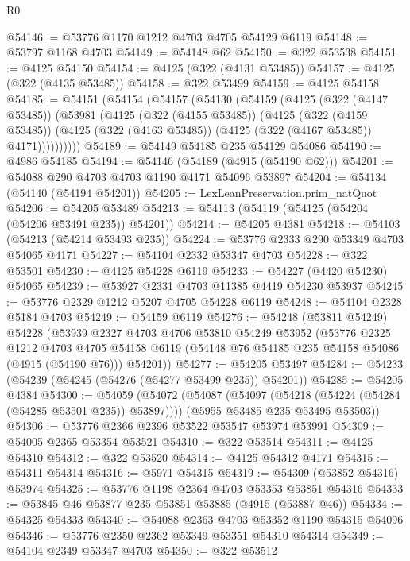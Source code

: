 \begin{lexlean}{R0}
\begin{coremodule}
@54146 := @53776 @1170 @1212 @4703 @4705 @54129 @6119
@54148 := @53797 @1168 @4703
@54149 := @54148 @62
@54150 := @322 @53538
@54151 := @4125 @54150
@54154 := @4125 (@322 (@4131 @53485))
@54157 := @4125 (@322 (@4135 @53485))
@54158 := @322 @53499
@54159 := @4125 @54158
@54185 := @54151
    (@54154
      (@54157
        (@54130
          (@54159
            (@4125
              (@322 (@4147 @53485))
              (@53981
                (@4125
                  (@322 (@4155 @53485))
                  (@4125
                    (@322 (@4159 @53485))
                    (@4125 (@322 (@4163 @53485)) (@4125 (@322 (@4167 @53485)) @4171))))))))))
@54189 := @54149 @54185 @235 @54129 @54086
@54190 := @4986 @54185
@54194 := @54146 (@54189 (@4915 (@54190 @62)))
@54201 := @54088 @290 @4703 @4703 @1190 @4171 @54096 @53897
@54204 := @54134 (@54140 (@54194 @54201))
@54205 := LexLeanPreservation.prim_natQuot
@54206 := @54205 @53489
@54213 := @54113 (@54119 (@54125 (@54204 (@54206 @53491 @235)) @54201))
@54214 := @54205 @4381
@54218 := @54103 (@54213 (@54214 @53493 @235))
@54224 := @53776 @2333 @290 @53349 @4703 @54065 @4171
@54227 := @54104 @2332 @53347 @4703
@54228 := @322 @53501
@54230 := @4125 @54228 @6119
@54233 := @54227 (@4420 @54230) @54065
@54239 := @53927 @2331 @4703 @11385 @4419 @54230 @53937
@54245 := @53776 @2329 @1212 @5207 @4705 @54228 @6119
@54248 := @54104 @2328 @5184 @4703
@54249 := @54159 @6119
@54276 := @54248
    (@53811 @54249)
    @54228
    (@53939
      @2327
      @4703
      @4706
      @53810
      @54249
      @53952
      (@53776
        @2325
        @1212
        @4703
        @4705
        @54158
        @6119
        (@54148 @76 @54185 @235 @54158 @54086 (@4915 (@54190 @76)))
        @54201))
@54277 := @54205 @53497
@54284 := @54233 (@54239 (@54245 (@54276 (@54277 @53499 @235)) @54201))
@54285 := @54205 @4384
@54300 := @54059
    (@54072
      (@54087 (@54097 (@54218 (@54224 (@54284 (@54285 @53501 @235)) @53897))))
      (@5955 @53485 @235 @53495 @53503))
@54306 := @53776 @2366 @2396 @53522 @53547 @53974 @53991
@54309 := @54005 @2365 @53354 @53521
@54310 := @322 @53514
@54311 := @4125 @54310
@54312 := @322 @53520
@54314 := @4125 @54312 @4171
@54315 := @54311 @54314
@54316 := @5971 @54315
@54319 := @54309 (@53852 @54316) @53974
@54325 := @53776 @1198 @2364 @4703 @53353 @53851 @54316
@54333 := @53845 @46 @53877 @235 @53851 @53885 (@4915 (@53887 @46))
@54334 := @54325 @54333
@54340 := @54088 @2363 @4703 @53352 @1190 @54315 @54096
@54346 := @53776 @2350 @2362 @53349 @53351 @54310 @54314
@54349 := @54104 @2349 @53347 @4703
@54350 := @322 @53512

\end{coremodule}
\end{lexlean}
